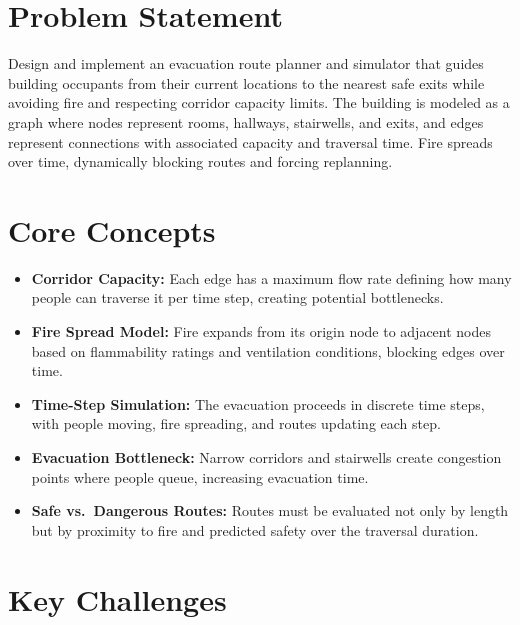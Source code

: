 \section{Problem Statement}

Design and implement an evacuation route planner and simulator that guides building occupants from their current locations to the nearest safe exits while avoiding fire and respecting corridor capacity limits. The building is modeled as a graph where nodes represent rooms, hallways, stairwells, and exits, and edges represent connections with associated capacity and traversal time. Fire spreads over time, dynamically blocking routes and forcing replanning.

\section{Core Concepts}

\begin{itemize}
  \item \textbf{Corridor Capacity:} Each edge has a maximum flow rate defining how many people can traverse it per time step, creating potential bottlenecks.
  \item \textbf{Fire Spread Model:} Fire expands from its origin node to adjacent nodes based on flammability ratings and ventilation conditions, blocking edges over time.
  \item \textbf{Time-Step Simulation:} The evacuation proceeds in discrete time steps, with people moving, fire spreading, and routes updating each step.
  \item \textbf{Evacuation Bottleneck:} Narrow corridors and stairwells create congestion points where people queue, increasing evacuation time.
  \item \textbf{Safe vs.\ Dangerous Routes:} Routes must be evaluated not only by length but by proximity to fire and predicted safety over the traversal duration.
\end{itemize}

\section{Key Challenges}

